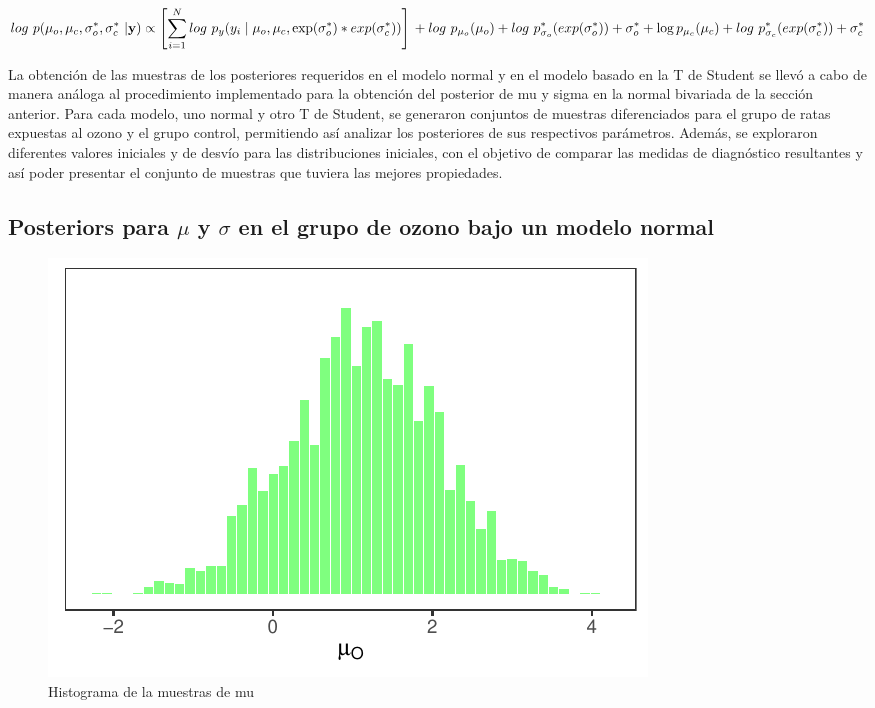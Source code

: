 \documentclass[
]{article}
\begin{document}
\[log \ p(\mu_o,\mu_c, \sigma_o^*, \sigma_c^*\ | \textbf{y}) \propto\left[ \sum_{i = 1}^{N} log\ p_y(y_i \mid \mu_o, \mu_c,\exp(\sigma_o^*)*exp(\sigma_c^*))\right] \\ + log\ {p_{\mu_o}(\mu_o)} + log \ p_{\sigma_o}^*(exp(\sigma_o^*)) + \sigma_o^* + \log{p_{\mu_c}(\mu_c)} + log\ p_{\sigma_c}^*(exp(\sigma_c^*)) + \sigma_c^*\]

La obtención de las muestras de los posteriores requeridos en el modelo normal y en el modelo basado en la T de Student se llevó a cabo de manera análoga al procedimiento implementado para la obtención del posterior de mu y sigma en la normal bivariada de la sección anterior. Para cada modelo, uno normal y otro T de Student, se generaron conjuntos de muestras diferenciados para el grupo de ratas expuestas al ozono y el grupo control, permitiendo así analizar los posteriores de sus respectivos parámetros. Además, se exploraron diferentes valores iniciales y de desvío para las distribuciones iniciales, con el objetivo de comparar las medidas de diagnóstico resultantes y así poder presentar el conjunto de muestras que tuviera las mejores propiedades.

\subsection{\texorpdfstring{Posteriors para \(\mu\) y \(\sigma\) en el grupo de ozono bajo un modelo normal}{Posteriors para \textbackslash mu y \textbackslash sigma en el grupo de ozono bajo un modelo normal}}\label{posteriors-para-mu-y-sigma-en-el-grupo-de-ozono-bajo-un-modelo-normal}

\begin{figure}

{\centering \includegraphics{TP-2---El-Dibu-de-la-vida_files/figure-latex/f19-1} 

}

\caption{Histograma de la muestras de mu}\label{fig:f19}
\end{figure}
\end{document}
